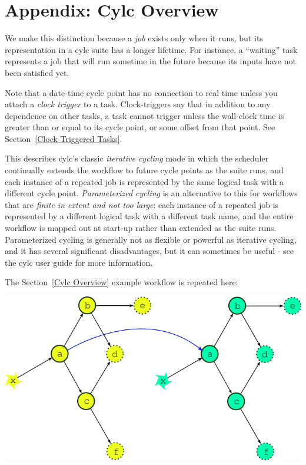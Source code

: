\section{Appendix: Cylc Overview}
\label{Appendix Cylc Overview}


 We make this distinction because a {\em job}
exists only when it runs, but its representation in a cylc suite has a longer
lifetime.  For instance, a ``waiting'' task represents a job that will run
sometime in the future because its inputs have not been satisfied yet.

  Note that a date-time cycle point has no connection to real
time unless you attach a {\em clock trigger} to a task. Clock-triggers
say that in addition to any dependence on other tasks, a task cannot trigger
unless the wall-clock time is greater than or equal to its cycle point, or some
offset from that point. See Section~\ref{Clock Triggered Tasks}.

  This describes
cylc's classic {\em iterative cycling} mode in which the scheduler continually
extends the workflow to future cycle points as the suite runs, and each
instance of a repeated job is represented by the same logical task with a
different cycle point. {\em Parameterized cycling} is an alternative to this
for workflows that are {\em finite in extent and not too large}: each instance
of a repeated job is represented by a different logical task with a different
task name, and the entire workflow is mapped out at start-up rather than
extended as the suite runs. Parameterized cycling is generally not as flexible
or powerful as iterative cycling, and it has several significant disadvantages,
but it can sometimes be useful - see the cylc user guide for more information. 

The Section~\ref{Cylc Overview} example workflow is repeated here:
\begin{center}
    \includegraphics[width=0.4\columnwidth]{resources/tex/dep-two-cycles-linked}
\end{center}

